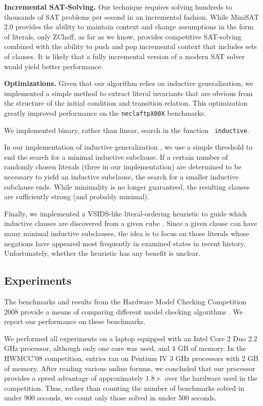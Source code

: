 \documentclass{llncs}
\begin{document}
{\bf Incremental SAT-Solving.}  Our technique requires solving
hundreds to thousands of SAT problems per second in an incremental
fashion.  While MiniSAT 2.0 provides the ability to maintain context
and change assumptions in the form of literals, only ZChaff, as far as
we know, provides competitive SAT-solving combined with the ability to
push and pop incremental context that includes sets of clauses.  It is
likely that a fully incremental version of a modern SAT solver would
yield better performance.

{\bf Optimizations.}  Given that our algorithm relies on inductive
generalization, we implemented a simple method to extract literal
invariants that are obvious from the structure of the initial
condition and transition relation.  This optimization greatly improved
performance on the {\tt neclaftpX00X} benchmarks.

We implemented binary, rather than linear, search in the function {\tt
  inductive}.

In our implementation of inductive generalization
\cite{Bradley+Manna/2007}, we use a simple threshold to end the search
for a minimal inductive subclause.  If a certain number of randomly
chosen literals (three in our implementation) are determined to be
necessary to yield an inductive subclause, the search for a smaller
inductive subclause ends.  While minimality is no longer guaranteed,
the resulting clauses are sufficiently strong (and probably minimal).

Finally, we implemented a VSIDS-like literal-ordering heuristic to
guide which inductive clauses are discovered from a given cube
\cite{Moskewicz+Others/2001}.  Since a given clause can have many
minimal inductive subclauses, the idea is to focus on those literals
whose negations have appeared most frequently in examined states in
recent history.  Unfortunately, whether the heuristic has any benefit
is unclear.





\subsection{Experiments}

The benchmarks and results from the Hardware Model Checking
Competition 2008 provide a means of comparing different model checking
algorithms \cite{hwmcc08}.  We report our performance on these
benchmarks.

We performed all experiments on a laptop equipped with an Intel Core 2
Duo 2.2 GHz processor, although only one core was used, and 4 GB of
memory.  In the HWMCC'08 competition, entries ran on Pentium IV 3 GHz
processors with 2 GB of memory.  After reading various online forums,
we concluded that our processor provides a speed advantage of
approximately $1.8\times$ over the hardware used in the competition.
Thus, rather than counting the number of benchmarks solved in under
900 seconds, we count only those solved in under 500 seconds.
\end{document}
